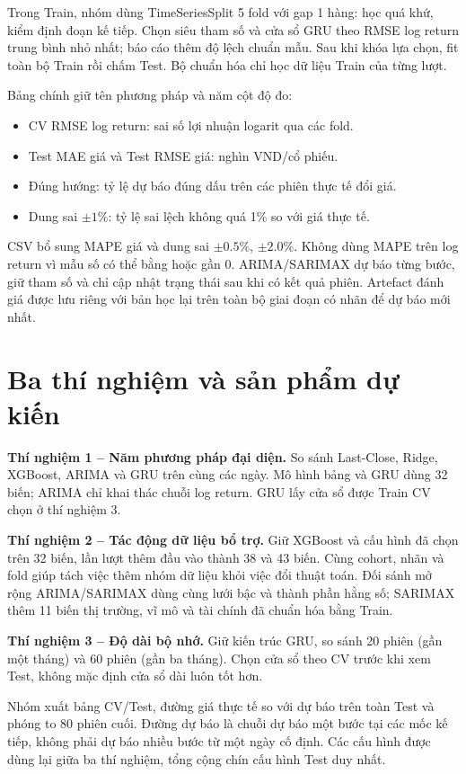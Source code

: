 \documentclass[12pt,a4paper]{article}
\begin{document}
Trong Train, nhóm dùng TimeSeriesSplit 5 fold với gap 1 hàng: học quá khứ, kiểm định đoạn kế tiếp. Chọn siêu tham số và cửa sổ GRU theo RMSE log return trung bình nhỏ nhất; báo cáo thêm độ lệch chuẩn mẫu. Sau khi khóa lựa chọn, fit toàn bộ Train rồi chấm Test. Bộ chuẩn hóa chỉ học dữ liệu Train của từng lượt.

Bảng chính giữ tên phương pháp và năm cột độ đo:
\begin{itemize}
\item CV RMSE log return: sai số lợi nhuận logarit qua các fold.
\item Test MAE giá và Test RMSE giá: nghìn VND/cổ phiếu.
\item Đúng hướng: tỷ lệ dự báo đúng dấu trên các phiên thực tế đổi giá.
\item Dung sai $\pm1\%$: tỷ lệ sai lệch không quá 1\% so với giá thực tế.
\end{itemize}
CSV bổ sung MAPE giá và dung sai $\pm0.5\%$, $\pm2.0\%$. Không dùng MAPE trên log return vì mẫu số có thể bằng hoặc gần 0. ARIMA/SARIMAX dự báo từng bước, giữ tham số và chỉ cập nhật trạng thái sau khi có kết quả phiên. Artefact đánh giá được lưu riêng với bản học lại trên toàn bộ giai đoạn có nhãn để dự báo mới nhất.

\newpage
\section{Ba thí nghiệm và sản phẩm dự kiến}
\textbf{Thí nghiệm 1 -- Năm phương pháp đại diện.} So sánh Last-Close, Ridge, XGBoost, ARIMA và GRU trên cùng các ngày. Mô hình bảng và GRU dùng 32 biến; ARIMA chỉ khai thác chuỗi log return. GRU lấy cửa sổ được Train CV chọn ở thí nghiệm 3.

\textbf{Thí nghiệm 2 -- Tác động dữ liệu bổ trợ.} Giữ XGBoost và cấu hình đã chọn trên 32 biến, lần lượt thêm đầu vào thành 38 và 43 biến. Cùng cohort, nhãn và fold giúp tách việc thêm nhóm dữ liệu khỏi việc đổi thuật toán. Đối sánh mở rộng ARIMA/SARIMAX dùng cùng lưới bậc và thành phần hằng số; SARIMAX thêm 11 biến thị trường, vĩ mô và tài chính đã chuẩn hóa bằng Train.

\textbf{Thí nghiệm 3 -- Độ dài bộ nhớ.} Giữ kiến trúc GRU, so sánh 20 phiên (gần một tháng) và 60 phiên (gần ba tháng). Chọn cửa sổ theo CV trước khi xem Test, không mặc định cửa sổ dài luôn tốt hơn.

Nhóm xuất bảng CV/Test, đường giá thực tế so với dự báo trên toàn Test và phóng to 80 phiên cuối. Đường dự báo là chuỗi dự báo một bước tại các mốc kế tiếp, không phải dự báo nhiều bước từ một ngày cố định. Các cấu hình được dùng lại giữa ba thí nghiệm, tổng cộng chín cấu hình Test duy nhất.
\end{document}
